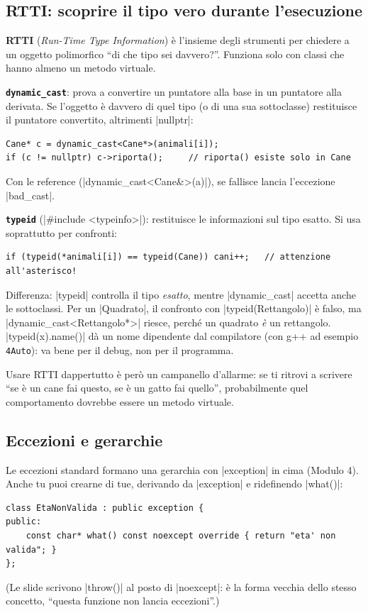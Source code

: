 \subsection*{RTTI: scoprire il tipo vero durante l'esecuzione}

\textbf{RTTI} (\emph{Run-Time Type Information}) è l'insieme degli strumenti per
chiedere a un oggetto polimorfico ``di che tipo sei davvero?''. Funziona solo con classi
che hanno almeno un metodo virtuale.

\textbf{\texttt{dynamic\_cast}}: prova a convertire un puntatore alla base in un
puntatore alla derivata. Se l'oggetto è davvero di quel tipo (o di una sua sottoclasse)
restituisce il puntatore convertito, altrimenti \cc|nullptr|:
\begin{lstlisting}
Cane* c = dynamic_cast<Cane*>(animali[i]);
if (c != nullptr) c->riporta();     // riporta() esiste solo in Cane
\end{lstlisting}
Con le reference (\cc|dynamic_cast<Cane&>(a)|), se fallisce lancia l'eccezione
\cc|bad_cast|.

\textbf{\texttt{typeid}} (\cc|#include <typeinfo>|): restituisce le informazioni sul
tipo esatto. Si usa soprattutto per confronti:
\begin{lstlisting}
if (typeid(*animali[i]) == typeid(Cane)) cani++;   // attenzione all'asterisco!
\end{lstlisting}
Differenza: \cc|typeid| controlla il tipo \emph{esatto}, mentre \cc|dynamic_cast|
accetta anche le sottoclassi. Per un \cc|Quadrato|, il confronto con
\cc|typeid(Rettangolo)| è falso, ma \cc|dynamic_cast<Rettangolo*>| riesce, perché un
quadrato \emph{è} un rettangolo. \cc|typeid(x).name()| dà un nome
dipendente dal compilatore (con g++ ad esempio \texttt{4Auto}): va bene per il debug,
non per il programma.

Usare RTTI dappertutto è però un campanello d'allarme: se ti ritrovi a scrivere
``se è un cane fai questo, se è un gatto fai quello'', probabilmente quel comportamento
dovrebbe essere un metodo virtuale.

\subsection*{Eccezioni e gerarchie}

Le eccezioni standard formano una gerarchia con \cc|exception| in cima (Modulo 4).
Anche tu puoi crearne di tue, derivando da \cc|exception| e ridefinendo \cc|what()|:
\begin{lstlisting}
class EtaNonValida : public exception {
public:
    const char* what() const noexcept override { return "eta' non valida"; }
};
\end{lstlisting}
(Le slide scrivono \cc|throw()| al posto di \cc|noexcept|: è la forma vecchia dello
stesso concetto, ``questa funzione non lancia eccezioni''.)

